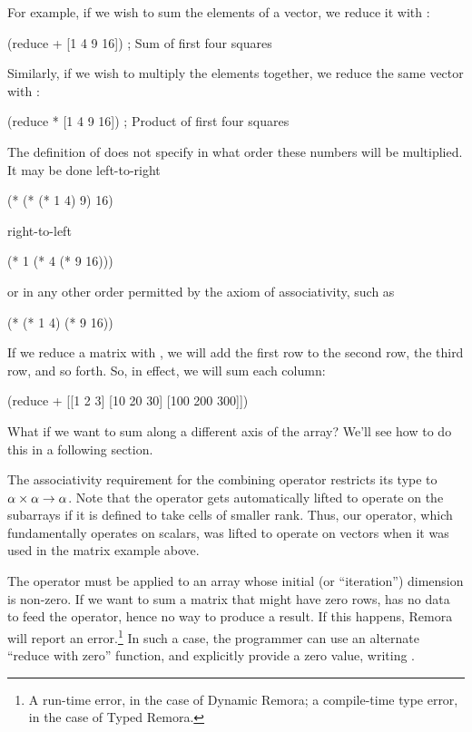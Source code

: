 For example, if we wish to sum the elements of a vector,
we reduce it with \ex{+}:
\begin{code}
    (reduce + [1 4 9 16]) ; Sum of first four squares
\end{code}
Similarly, if we wish to multiply the elements together,
we reduce the same vector with \ex{*}:
\begin{code}
    (reduce * [1 4 9 16]) ; Product of first four squares
\end{code}
%
The definition of  does not specify in what order these
numbers will be multiplied.
It may be done left-to-right
\begin{code}
(* (* (* 1 4) 9) 16)\end{code}
right-to-left
\begin{code}
(* 1 (* 4 (* 9 16)))\end{code}
or in any other order permitted by the axiom of associativity,
such as
\begin{code}
(* (* 1 4) (* 9 16))\end{code}

If we reduce a matrix with \ex{+},
we will add the first row to the second row, the third row, and so forth.
So, in effect, we will sum each column:
\begin{code}
    (reduce + [[1     2   3]
               [10   20  30]
               [100 200 300]])
\result{[111 222 333]}\end{code}
What if we want to sum along a different axis of the array?
We'll see how to do this in a following section.

The associativity requirement for the combining operator
restricts its type to $\alpha \times \alpha \rightarrow \alpha$.
Note that the operator gets automatically lifted to operate on the subarrays
if it is defined to take cells of smaller rank.
Thus, our \ex{+} operator, which fundamentally operates on scalars,
was lifted to operate on vectors when it was used in the matrix example above.

The  operator must be applied to an array whose initial
(or ``iteration'') dimension is non-zero.
If we want to sum a matrix  that might have zero rows,
 has no data to feed the \ex{+} operator,
hence no way to produce a result.
If this happens, Remora will report an error.\footnote{A run-time error,
in the case of Dynamic Remora;
a compile-time type error, in the case of Typed Remora.}
In such a case,
the programmer can use an alternate ``reduce with zero'' function,
and explicitly provide a zero value, writing .


